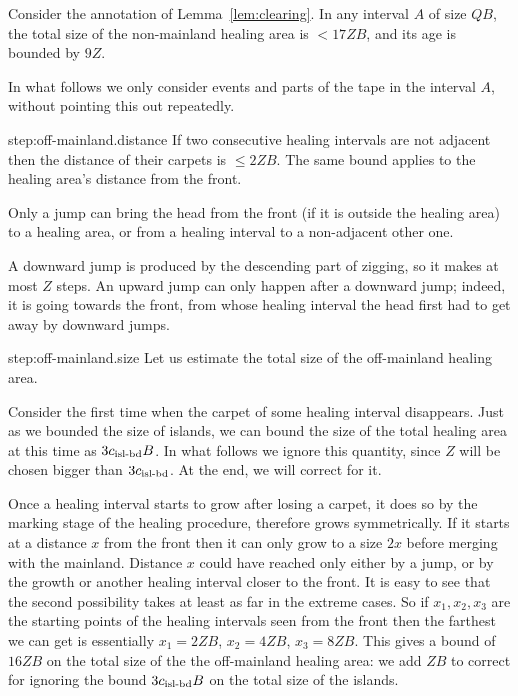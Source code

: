 \documentclass[12pt]{memoir}
\renewcommand{\le}{\leq}
\def\B{B}
\newcommand{\Z}{Z}
\newcommand{\cns}[1]{c_{\textrm{\upshape #1}}}
\begin{document}
\begin{lemma}\label{lem:mainland}
Consider the annotation of Lemma~\ref{lem:clearing}.
In any interval \( A \) of
size \( Q\B \), the total size of the non-mainland healing area
is \( <17\Z\B \), and its age is bounded by \( 9\Z \).
\end{lemma}
\begin{Proof}
In what follows we only consider events and parts of the tape
in the interval \( A \), without pointing this out repeatedly.

\begin{step+}{step:off-mainland.distance}
If two consecutive healing intervals are not adjacent then the 
distance of their carpets is \( \le 2\Z\B \).
The same bound applies to the healing area's distance from the front.
\end{step+}
\begin{pproof} 
Only a jump can bring the head from the front (if it is outside
the healing area) to a healing area, or from a healing interval to a
non-adjacent other one.

A downward jump is produced by the descending part of zigging, so it 
makes at most \( \Z \) steps.
An upward jump can only happen after a downward jump; indeed, 
it is going towards the front, from whose healing interval
the head first had to get away by downward jumps.
\end{pproof} %

\begin{step+}{step:off-mainland.size}
Let us estimate the total size of the off-mainland healing area.
\end{step+}
\begin{prooof}
Consider the first time when the carpet of some healing 
interval disappears.
Just as we bounded the size of islands, we can bound the size of the total healing area
at this time as \( 3\cns{isl-bd}\B \).
In what follows we ignore this quantity, since \( \Z \) will be chosen
bigger than \( 3\cns{isl-bd} \).
At the end, we will correct for it.

Once a healing interval starts to grow after losing a carpet, it does
so by the marking stage of the healing procedure, therefore grows symmetrically.
If it starts at a distance \( x \) from the front then it can only grow to a
size \( 2 x \) before merging with the mainland.
Distance \( x \) could have reached only either by a jump, or by the growth
or another healing interval closer to the front.
It is easy to see that the second possibility takes at least as far 
in the extreme cases.
So if \( x_{1},x_{2},x_{3} \) are the starting points of the healing intervals
seen from the front then the farthest we can get is essentially
\( x_{1}=2\Z\B \), \( x_{2}=4\Z\B \), \( x_{3}=8\Z\B \).
This gives a bound of \( 16\Z\B \) on the total size of the the off-mainland healing
area: we add \( \Z\B \) to correct for ignoring the bound
\( 3\cns{isl-bd}\B \) on the total size of the islands.
\end{prooof} %


\end{Proof}
\end{document}
